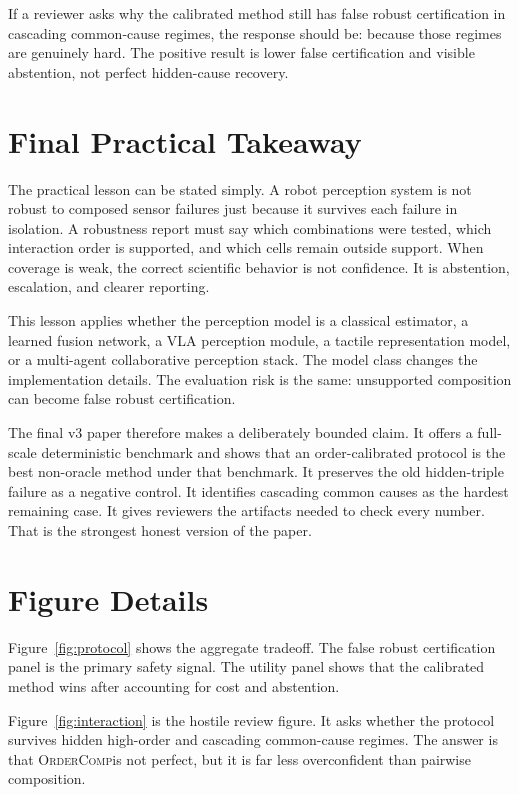 \documentclass{article}
\newcommand{\method}{\textsc{OrderComp}}
\begin{document}
If a reviewer asks why the calibrated method still has false robust certification in cascading common-cause regimes, the response should be: because those regimes are genuinely hard. The positive result is lower false certification and visible abstention, not perfect hidden-cause recovery.

\section{Final Practical Takeaway}

The practical lesson can be stated simply. A robot perception system is not robust to composed sensor failures just because it survives each failure in isolation. A robustness report must say which combinations were tested, which interaction order is supported, and which cells remain outside support. When coverage is weak, the correct scientific behavior is not confidence. It is abstention, escalation, and clearer reporting.

This lesson applies whether the perception model is a classical estimator, a learned fusion network, a VLA perception module, a tactile representation model, or a multi-agent collaborative perception stack. The model class changes the implementation details. The evaluation risk is the same: unsupported composition can become false robust certification.

The final v3 paper therefore makes a deliberately bounded claim. It offers a full-scale deterministic benchmark and shows that an order-calibrated protocol is the best non-oracle method under that benchmark. It preserves the old hidden-triple failure as a negative control. It identifies cascading common causes as the hardest remaining case. It gives reviewers the artifacts needed to check every number. That is the strongest honest version of the paper.

\section{Figure Details}

Figure~\ref{fig:protocol} shows the aggregate tradeoff. The false robust certification panel is the primary safety signal. The utility panel shows that the calibrated method wins after accounting for cost and abstention.

Figure~\ref{fig:interaction} is the hostile review figure. It asks whether the protocol survives hidden high-order and cascading common-cause regimes. The answer is that \method is not perfect, but it is far less overconfident than pairwise composition.
\end{document}
